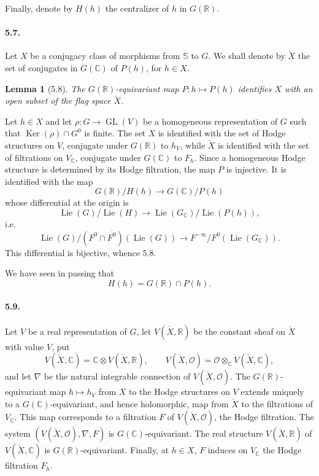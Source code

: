 \documentclass[10pt]{article}
\newcommand{\C}{\mathbb C}
\newcommand{\R}{\mathbb R}
\newcommand{\bS}{\mathbb S}
\newcommand{\cO}{\mathcal O}
\newcommand{\Ker}{\operatorname{Ker}}
\theoremstyle{deligne}
\newtheorem*{lemma}{Lemma}
\newcommand{\Lie}{\operatorname{Lie}}
\newcommand{\GL}{\operatorname{GL}}
\begin{document}
Finally, denote by $H(h)$ the centralizer of $h$ in $G(\R)$.

\paragraph{5.7.}
Let $X$ be a conjugacy class of morphisms from $\bS$ to $G$. We shall denote by $\check X$ the set of conjugates in $G(\C)$ of $P(h)$, for $h\in X$.

\begin{lemma}[5.8]
The $G(\R)$-equivariant map $P:h\mapsto P(h)$ identifies $X$ with an open subset of the flag space $\check X$.
\end{lemma}

Let $h\in X$ and let $\rho:G\to\GL(V)$ be a homogeneous representation of $G$ such that $\Ker(\rho)\cap G^0$ is finite. The set $X$ is identified with the set of Hodge structures on $V$, conjugate under $G(\R)$ to $h_V$, while $\check X$ is identified with the set of filtrations on $V_\C$, conjugate under $G(\C)$ to $F_h$. Since a homogeneous Hodge structure is determined by its Hodge filtration, the map $P$ is injective. It is identified with the map
\[
  G(\R)/H(h)\longrightarrow G(\C)/P(h)
\]
whose differential at the origin is
\[
  \Lie(G)/\Lie(H)\longrightarrow \Lie(G_\C)/\Lie(P(h)),
\]
i.e.
\[
  \Lie(G)/(F^0\cap\overline{F^0})(\Lie(G))
  \longrightarrow
  F^{-\infty}/F^0(\Lie(G_\C)).
\]
This differential is bijective, whence 5.8.

We have seen in passing that
\[
\tag{5.8.1}
  H(h)=G(\R)\cap P(h).
\]

\paragraph{5.9.}
Let $V$ be a real representation of $G$, let $V(\check X,\R)$ be the constant sheaf on $\check X$ with value $V$, put
\[
  V(\check X,\C)=\C\otimes V(\check X,\R),\qquad
  V(\check X,\cO)=\cO\otimes_\C V(\check X,\C),
\]
and let $\nabla$ be the natural integrable connection of $V(\check X,\cO)$. The $G(\R)$-equivariant map $h\mapsto h_V$ from $X$ to the Hodge structures on $V$ extends uniquely to a $G(\C)$-equivariant, and hence holomorphic, map from $\check X$ to the filtrations of $V_\C$. This map corresponds to a filtration $F$ of $V(\check X,\cO)$, the Hodge filtration. The system $(V(\check X,\cO),\nabla,F)$ is $G(\C)$-equivariant. The real structure $V(\check X,\R)$ of $V(\check X,\C)$ is $G(\R)$-equivariant. Finally, at $h\in X$, $F$ induces on $V_\C$ the Hodge filtration $F_h$.
\end{document}

